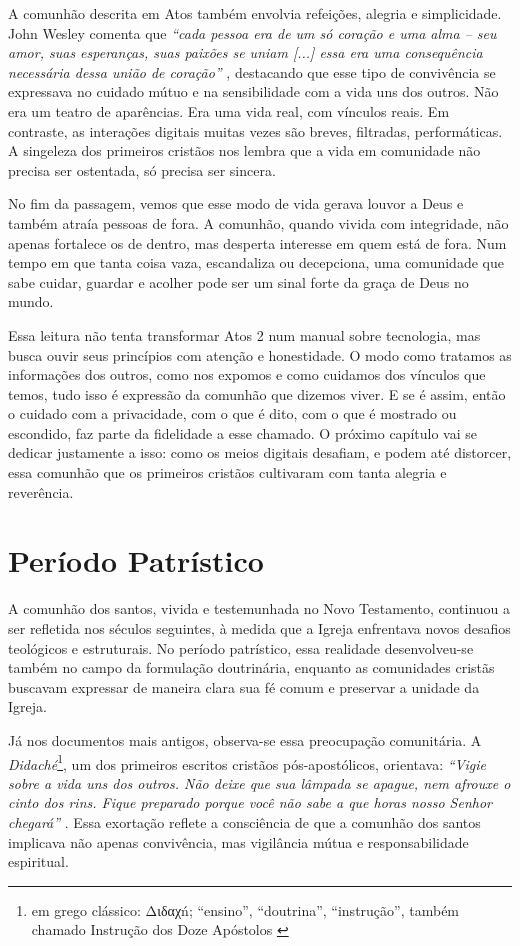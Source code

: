 A comunhão descrita em Atos também envolvia refeições, alegria e simplicidade. John Wesley comenta que \textit{``cada pessoa era de um só coração e uma alma – seu amor, suas esperanças, suas paixões se uniam [...] essa era uma consequência necessária dessa união de coração''} \cite{wesleyAtos4}, destacando que esse tipo de convivência se expressava no cuidado mútuo e na sensibilidade com a vida uns dos outros. Não era um teatro de aparências. Era uma vida real, com vínculos reais. Em contraste, as interações digitais muitas vezes são breves, filtradas, performáticas. A singeleza dos primeiros cristãos nos lembra que a vida em comunidade não precisa ser ostentada, só precisa ser sincera.

No fim da passagem, vemos que esse modo de vida gerava louvor a Deus e também atraía pessoas de fora. A comunhão, quando vivida com integridade, não apenas fortalece os de dentro, mas desperta interesse em quem está de fora. Num tempo em que tanta coisa vaza, escandaliza ou decepciona, uma comunidade que sabe cuidar, guardar e acolher pode ser um sinal forte da graça de Deus no mundo.

Essa leitura não tenta transformar Atos 2 num manual sobre tecnologia, mas busca ouvir seus princípios com atenção e honestidade. O modo como tratamos as informações dos outros, como nos expomos e como cuidamos dos vínculos que temos, tudo isso é expressão da comunhão que dizemos viver. E se é assim, então o cuidado com a privacidade, com o que é dito, com o que é mostrado ou escondido, faz parte da fidelidade a esse chamado. O próximo capítulo vai se dedicar justamente a isso: como os meios digitais desafiam, e podem até distorcer, essa comunhão que os primeiros cristãos cultivaram com tanta alegria e reverência.

\section{Período Patrístico}

A comunhão dos santos, vivida e testemunhada no Novo Testamento, continuou a ser refletida nos séculos seguintes, à medida que a Igreja enfrentava novos desafios teológicos e estruturais. No período patrístico, essa realidade desenvolveu-se também no campo da formulação doutrinária, enquanto as comunidades cristãs buscavam expressar de maneira clara sua fé comum e preservar a unidade da Igreja.

Já nos documentos mais antigos, observa-se essa preocupação comunitária. A \textit{Didaché}\footnote{em grego clássico: \foreignlanguage{greek}{Διδαχń}; ``ensino'', ``doutrina'', ``instrução'', também chamado Instrução dos Doze Apóstolos \cite{wikididaque}}, um dos primeiros escritos cristãos pós-apostólicos, orientava: \textit{``Vigie sobre a vida uns dos outros. Não deixe que sua lâmpada se apague, nem afrouxe o cinto dos rins. Fique preparado porque você não sabe a que horas nosso Senhor chegará''} \cite{didachePaulus2013}. Essa exortação reflete a consciência de que a comunhão dos santos implicava não apenas convivência, mas vigilância mútua e responsabilidade espiritual.


